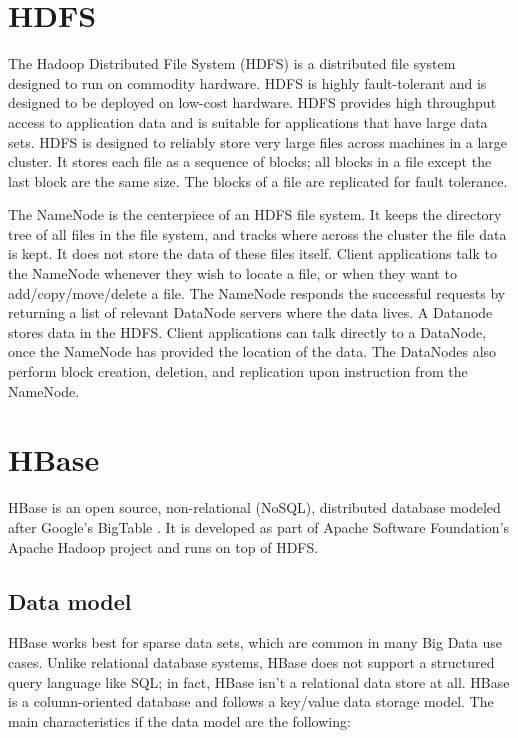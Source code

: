 \section{HDFS}

The Hadoop Distributed File System (HDFS) \cite{28} is a distributed file system designed to run on commodity hardware. HDFS is highly fault-tolerant and is 
designed to be deployed on low-cost hardware. HDFS provides high throughput access to application data and is suitable for applications that have large data sets. 
HDFS is designed to reliably store very large files across machines in a large cluster. It stores each file as a sequence of blocks; all blocks in a file except 
the last block are the same size. The blocks of a file are replicated for fault tolerance.

The NameNode is the centerpiece of an HDFS file system. It keeps the directory tree of all files in the file system, and tracks where across the cluster the file data 
is kept. It does not store the data of these files itself. Client applications talk to the NameNode whenever they wish to locate a file, or when they want to 
add/copy/move/delete a file. The NameNode responds the successful requests by returning a list of relevant DataNode servers where the data lives. A Datanode 
stores data in the HDFS. Client applications can talk directly to a DataNode, once the NameNode has provided the location of the data. 
The DataNodes also perform block creation, deletion, and replication upon instruction from the NameNode. 


\section{HBase}

HBase is an open source, non-relational (NoSQL), distributed database modeled after Google's BigTable \cite{24}. It is developed as part of Apache Software Foundation's Apache 
Hadoop project and runs on top of HDFS.  

\subsection{Data model}

HBase works best for sparse data sets, which are common in many Big Data use cases. Unlike relational database systems, HBase does not support a 
structured query language like SQL; in fact, HBase isn’t a relational data store at all. HBase  is a column-oriented database and follows a 
key/value data storage model. The main characteristics if the data model are the following: 

